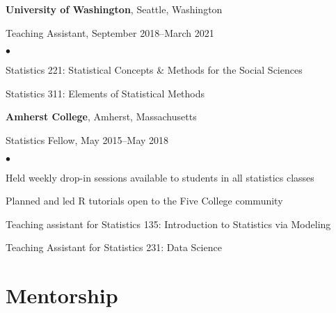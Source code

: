 \documentclass[margin,centered]{res}
\newenvironment{list1}{
  \begin{list}{\ding{113}}{%
      \setlength{\itemsep}{0in}
      \setlength{\parsep}{0in} \setlength{\parskip}{0in}
      \setlength{\topsep}{0in} \setlength{\partopsep}{0in}
      \setlength{\leftmargin}{0.17in}}}{\end{list}}
\newenvironment{list2}{
  \begin{list}{$\bullet$}{%
      \setlength{\itemsep}{0in}
      \setlength{\parsep}{0in} \setlength{\parskip}{0in}
      \setlength{\topsep}{0in} \setlength{\partopsep}{0in}
      \setlength{\leftmargin}{0.2in}}}{\end{list}}
\begin{document}
\begin{resume}
{\bf University of Washington}, Seattle, Washington
\begin{list1}
\item[] Teaching Assistant, September 2018--March 2021
\begin{list2}
\vspace*{.05in}
\item Statistics 221: Statistical Concepts \& Methods for the Social Sciences
\item Statistics 311: Elements of Statistical Methods
\end{list2}
\end{list1}

{\bf Amherst College}, Amherst, Massachusetts
\begin{list1}
\item[] Statistics Fellow, May 2015--May 2018
\begin{list2}
\vspace*{.05in}
\item Held weekly drop-in sessions available to students in all statistics classes
\item Planned and led R tutorials open to the Five College community
\item Teaching assistant for Statistics 135: Introduction to Statistics via Modeling
\item Teaching Assistant for Statistics 231: Data Science
\end{list2}
\end{list1}


\section{\sc Mentorship}


\end{resume}
\end{document}
